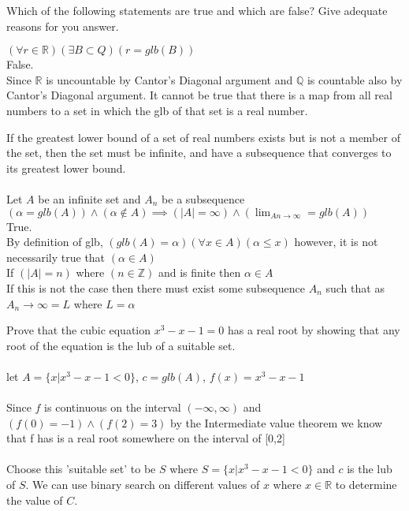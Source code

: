 \documentclass[12pt]{article}
\newenvironment{exercise}[2][Exercise]{\begin{trivlist}
\item[\hskip \labelsep {\bfseries #1}\hskip \labelsep {\bfseries #2.}]}{\end{trivlist}}
\newenvironment{question}[2][Question]{\begin{trivlist}
\item[\hskip \labelsep {\bfseries #1}\hskip \labelsep {\bfseries #2.}]}{\end{trivlist}}
\begin{document}
\begin{question}{6}
Which of the following statements are true and which are false? Give adequate reasons for you answer.
\end{question}
\begin{exercise}B
$(\forall r \in \mathbb{R})(\exists B \subset Q)(r = glb(B))$\\
False.\\
Since $\mathbb{R}$ is uncountable by Cantor's Diagonal argument and $\mathbb{Q}$ is countable also by Cantor's Diagonal argument. It cannot be true that there is a map from all real numbers to a set in which the glb of that set is a real number.
\end{exercise}
\begin{exercise}D
If the greatest lower bound of a set of real numbers exists but is not a member of the set, then the set must be infinite, and have a subsequence that converges to its greatest lower bound.\\ \\
Let $A$ be an infinite set and $A_n$ be a subsequence\\
$(\alpha = glb(A)) \wedge (\alpha \not \in A) \implies (|A| = \infty)\wedge (\lim_{An \rightarrow \infty} = glb(A)) $\\
True.\\
By definition of glb, $(glb(A) = \alpha)(\forall x \in A)(\alpha \leq x)$ however, it is not necessarily true that $(\alpha \in A)$\\
If $(|A| = n)$ where $(n \in \mathbb{Z})$ and is finite then $\alpha \in A$\\
If this is not the case then there must exist some subsequence $A_n$ such that as
$A_n \rightarrow \infty = L $ where $L=\alpha$
\end{exercise}
\begin{question}{7}
Prove that the cubic equation $x^3-x-1=0$ has a real root by showing that any root of the equation is the lub of a suitable set.\\ \\
let $A = \{ x \vert x^3 - x - 1 < 0\}$, $c = glb(A)$, $f(x) = x^3-x-1$\\ \\
Since $f$ is continuous on the interval $(-\infty, \infty)$ and $(f(0) = -1) \wedge (f(2) = 3)$
by the Intermediate value theorem we know that f has is a real root somewhere on the interval of [0,2] \\ \\
Choose this 'suitable set' to be $S$ where $S = \{ x \vert x^3-x-1 < 0\}$ and $c$ is the lub of $S$.
We can use binary search on different values of $x$ where $x \in \mathbb{R}$ to determine the value of $C$.
\end{question}
\end{document}
